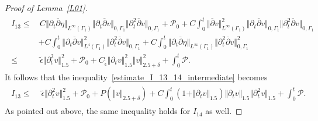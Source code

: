 \documentclass[10pt,reqno]{amsart}
\theoremstyle{plain}
\theoremstyle{definition}
\numberwithin{equation}{section}
\newcommand{\ccP}{\mathscr{P}}
\newcommand{\ccPz}{\mathscr{P}_0}
\newcommand{\Ga}{\Gamma}
\newcommand{\de}{\delta}
\newcommand{\norm}[1]{\Vert#1\Vert}
\begin{document}
\begin{proof}[Proof of Lemma~\ref{L01}]
\begin{align}
\begin{split}
I_{13} \leq & \, 
C \norm{ \partial_t \overline{\partial} \eta}_{L^\infty(\Ga_1)} 
\norm{\partial_t \overline{\partial} v}_{0,\Ga_1} 
\norm{\partial^2_t \overline{\partial} v}_{0,\Ga_1} 
+ 
\ccPz
+ C \int_0^t  \norm{ \overline{\partial} v}^2_{L^\infty(\Ga_1)} 
\norm{\partial_t \overline{\partial} v}_{0,\Ga_1} 
\norm{\partial^2_t \overline{\partial} v}_{0,\Ga_1}
\\&
+
C\int_0^t \norm{\partial_t \overline{\partial} v}^2_{L^4(\Ga_1)}
\norm{\partial^2_t \overline{\partial} v}_{0,\Ga_1}
+ C\int_0^t \norm{\partial_t \overline{\partial} \eta}_{L^\infty(\Ga_1)} 
\norm{\partial^2_t \overline{\partial} v}_{0,\Ga_1}^2
\\
\leq & \, \widetilde{\epsilon}  \norm{\partial^2_t v}_{1.5}^2
+ 
\ccPz
+ C_{\widetilde{\epsilon}} \norm{\partial_t v}_{1.5}^2\norm{v}^2_{2.5+\de}
+ 
\int_0^t \ccP.
\end{split}
\label{estimate_I_13_14_intermediate}
\end{align}
It follows that the inequality~\eqref{estimate_I_13_14_intermediate} becomes
\begin{align}
\begin{split}
I_{13}%
\leq  & \, 
\, \widetilde{\epsilon}  \norm{\partial^2_t v}_{1.5}^2 
+\ccPz
+ P(\norm{v}_{2.5+\de})
+ 
C\int_0^t (1 + \norm{\partial_t v}_{1.5} ) \norm{\partial_t v}_{1.5} 
\norm{\partial^2_t v}_{1.5} 
+ \int_0^t \ccP.
\end{split}
\label{estimate_I_13_14}
\end{align}
As pointed out above, the same inequality holds for $I_{14}$ as well.


\end{proof}
\end{document}

